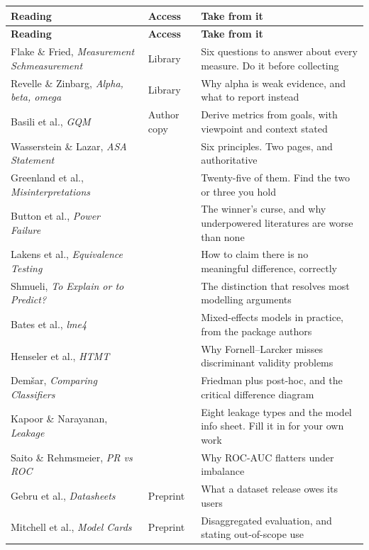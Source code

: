 \begin{center}
\small
\begin{longtable}{@{}L{4.4cm}L{1.8cm}L{7.6cm}@{}}
\toprule
\textbf{Reading} & \textbf{Access} & \textbf{Take from it} \\
\midrule
\endfirsthead
\toprule
\textbf{Reading} & \textbf{Access} & \textbf{Take from it} \\
\midrule
\endhead
\bottomrule
\endfoot
Flake \& Fried, \emph{Measurement Schmeasurement}~\cite{flake2020measurement}
  & Library
  & Six questions to answer about every measure. Do it before collecting \\
Revelle \& Zinbarg, \emph{Alpha, beta, omega}~\cite{revelle2009coefficients}
  & Library
  & Why alpha is weak evidence, and what to report instead \\
Basili et al., \emph{GQM}~\cite{basili1994goal}
  & Author copy
  & Derive metrics from goals, with viewpoint and context stated \\
Wasserstein \& Lazar, \emph{ASA Statement}~\cite{wasserstein2016asa}
  & \oa{}
  & Six principles. Two pages, and authoritative \\
Greenland et al., \emph{Misinterpretations}~\cite{greenland2016statistical}
  & \oa{}
  & Twenty-five of them. Find the two or three you hold \\
Button et al., \emph{Power Failure}~\cite{button2013power}
  & \oa{}
  & The winner's curse, and why underpowered literatures are worse than none \\
Lakens et al., \emph{Equivalence Testing}~\cite{lakens2018equivalence}
  & \oa{}
  & How to claim there is no meaningful difference, correctly \\
Shmueli, \emph{To Explain or to Predict?}~\cite{shmueli2010explain}
  & \oa{}
  & The distinction that resolves most modelling arguments \\
Bates et al., \emph{lme4}~\cite{bates2015fitting}
  & \oa{}
  & Mixed-effects models in practice, from the package authors \\
Henseler et al., \emph{HTMT}~\cite{henseler2015new}
  & \oa{}
  & Why Fornell--Larcker misses discriminant validity problems \\
Dem{\v s}ar, \emph{Comparing Classifiers}~\cite{demsar2006statistical}
  & \oa{}
  & Friedman plus post-hoc, and the critical difference diagram \\
Kapoor \& Narayanan, \emph{Leakage}~\cite{kapoor2023leakage}
  & \oa{}
  & Eight leakage types and the model info sheet. Fill it in for your own work \\
Saito \& Rehmsmeier, \emph{PR vs ROC}~\cite{saito2015precision}
  & \oa{}
  & Why ROC-AUC flatters under imbalance \\
Gebru et al., \emph{Datasheets}~\cite{gebru2021datasheets}
  & Preprint
  & What a dataset release owes its users \\
Mitchell et al., \emph{Model Cards}~\cite{mitchell2019model}
  & Preprint
  & Disaggregated evaluation, and stating out-of-scope use \\
\end{longtable}
\end{center}

